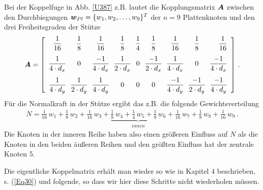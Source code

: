  Bei der Koppelfuge in Abb. \ref{U387} z.B. lautet die Kopplungsmatrix $\mbox{\boldmath $A$}$ zwischen den Durchbiegungen $\mbox{\boldmath $w$}_{Pl} = \{w_1, w_2, \ldots , w_9\}^T$ der $n = 9$ Plattenknoten  und den drei Freiheitsgraden der St\"{u}tze
\begin{align}
\vek A = \left[\barr{c @{\hspace{2mm}} c @{\hspace{2mm}} c @{\hspace{2mm}} c @{\hspace{2mm}} c @{\hspace{2mm}} c @{\hspace{2mm}} c @{\hspace{2mm}} c @{\hspace{2mm}} r} \displaystyle{ \frac{1}{16}} & \displaystyle{\frac{1}{8}} & \displaystyle{\frac{1}{16}}& \displaystyle{\frac{1}{8} } & \displaystyle{\frac{1}{4} }& \displaystyle{\frac{1}{8}} & \displaystyle{\frac{1}{16}}& \displaystyle{\frac{1}{8}} & \displaystyle{\frac{1}{16}} \vspace{0.3cm}\\
\displaystyle{\frac{1}{4 \cdot d_x}} & \displaystyle{0 } &\displaystyle{\frac{-1}{4 \cdot d_x}} & \displaystyle{\frac{1}{2 \cdot d_x}} & \displaystyle{0} & \displaystyle{\frac{-1}{2 \cdot d_x} } &\displaystyle{\frac{1}{4 \cdot d_x} }& \displaystyle{0} &\displaystyle{\frac{-1}{4 \cdot d_x}}
\vspace{0.3cm}\\
\displaystyle{\frac{1}{4 \cdot d_y}} & \displaystyle{\frac{1}{2 \cdot d_y}} & \displaystyle{\frac{1}{4 \cdot d_y}} & \displaystyle{0} &\displaystyle{0} & \displaystyle{0 } &\displaystyle{\frac{-1}{4 \cdot d_y}} & \displaystyle{\frac{-1}{2 \cdot d_y}} & \displaystyle{\frac{-1}{4 \cdot d_y}}
\earr\right]\,.
\end{align}
F\"{u}r die Normalkraft in der St\"{u}tze ergibt das z.B. die folgende Gewichtsverteilung
\begin{align}
N = \frac{1}{16}\,w_1 + \frac{1}{8}\,w_2 + \frac{1}{16}\,w_3 + \underbrace{\frac{1}{8}\,w_4 + \frac{1}{4}\,w_5 + \frac{1}{8}\,w_6}_{innen} + \frac{1}{16}\,w_7 + \frac{1}{8}\,w_8 + \frac{1}{16}\,w_9\,.
\end{align}
Die Knoten in der inneren Reihe haben also einen gr\"{o}{\ss}eren Einfluss auf $N$ als die Knoten in den beiden \"{a}u{\ss}eren Reihen und den gr\"{o}{\ss}ten Einfluss hat der zentrale Knoten 5.

Die eigentliche Koppelmatrix erh\"{a}lt man wieder so wie in Kapitel 4 beschrieben, s. (\ref{Eq30}) und folgende, so dass wir hier diese Schritte nicht wiederholen m\"{u}ssen.

